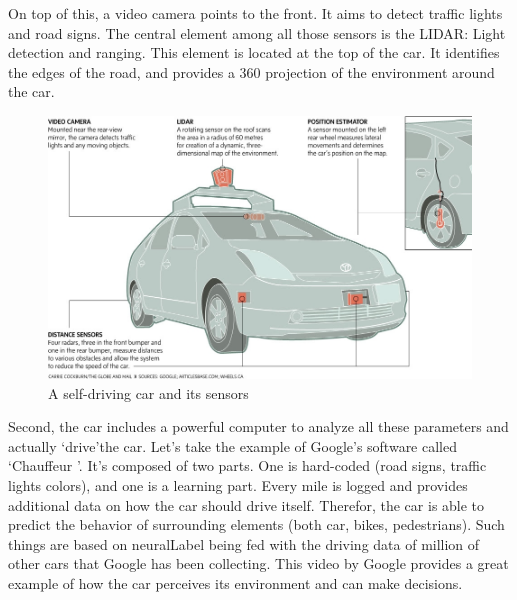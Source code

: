 \documentclass[12pt]{article}
\begin{document}
\noindent On top of this, a video camera points to the front. It aims to detect
traffic lights and road signs. The central element among all those sensors is
the LIDAR: Light detection and ranging. This element is located at the top of
the car. It identifies the edges of the road, and provides a 360 projection of
the environment around the car.

\smallskip

\begin{figure}[ht]
    \centering
    \includegraphics[width=\linewidth]{car-diagram}
    \caption{A self-driving car and its sensors}
    \label{fig:car}
\end{figure}

\smallskip

Second, the car includes a powerful computer to analyze all these parameters
and actually \lq drive\rq the car. Let's take the example of Google's software
called \lq Chauffeur \rq . It's composed of two parts. One is hard-coded
(road signs, traffic lights colors), and one is a learning part. Every mile is
logged and provides additional data on how the car should drive itself.
Therefor, the car is able to predict the behavior of surrounding elements
(both car, bikes, pedestrians). Such things are based on \gls{neuralLabel} being
fed with the driving data of million of other cars
that Google has been collecting. This video by Google provides a great example
of how the car perceives its environment and can make decisions.\\

\smallskip
\end{document}
